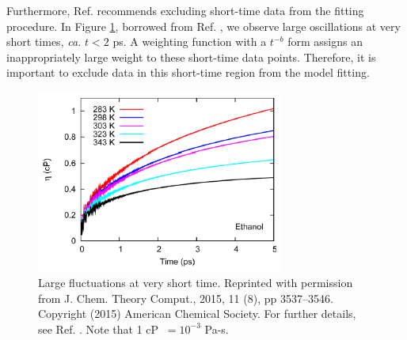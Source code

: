 \documentclass[9pt,bestpractices]{livecoms}
\begin{document}
Furthermore, Ref. \cite{Zhang2015} recommends excluding short-time data from the fitting procedure. In Figure \ref{fig:ZhangFig4}, borrowed from Ref. \cite{Zhang2015}, we observe large oscillations at very short times, \textit{ca.} $t < 2$ ps. A weighting function with a $t^{-b}$ form assigns an inappropriately large weight to these short-time data points. Therefore, it is important to exclude data in this short-time region from the model fitting. 

\begin{figure}[htb!]
	\centering
	\includegraphics[width=3.2in]{ZhangFig4.png}
	\caption{Large fluctuations at very short time. Reprinted with permission from J. Chem. Theory Comput., 2015, 11 (8), pp 3537–3546. Copyright (2015) American Chemical Society. For further details, see Ref. \cite{Zhang2015}. Note that 1 cP $\ = 10^{-3}$ Pa-s.}
	\label{fig:ZhangFig4}
\end{figure}  


\end{document}

